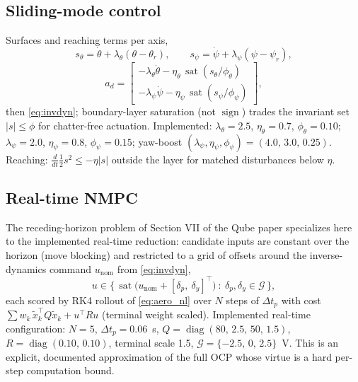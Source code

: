 \documentclass[conference]{IEEEtran}
\newcommand{\sat}{\operatorname{sat}}
\newcommand{\sign}{\operatorname{sign}}
\newcommand{\diag}{\operatorname{diag}}
\begin{document}
\subsection{Sliding-mode control}
Surfaces and reaching terms per axis,
\begin{equation}
s_\theta = \dot\theta + \lambda_\theta(\theta - \theta_r),\qquad
s_\psi = \dot\psi + \lambda_\psi(\psi - \psi_r),
\end{equation}
\begin{equation}
a_d = \begin{bmatrix}
-\lambda_\theta\dot\theta - \eta_\theta\,\sat(s_\theta/\phi_\theta)\\
-\lambda_\psi\dot\psi - \eta_\psi\,\sat(s_\psi/\phi_\psi)
\end{bmatrix},
\end{equation}
then \eqref{eq:invdyn}; boundary-layer saturation (not $\sign$) trades the invariant set $|s|\le\phi$ for chatter-free actuation. Implemented: $\lambda_\theta{=}2.5$, $\eta_\theta{=}0.7$, $\phi_\theta{=}0.10$; $\lambda_\psi{=}2.0$, $\eta_\psi{=}0.8$, $\phi_\psi{=}0.15$; yaw-boost $(\lambda_\psi,\eta_\psi,\phi_\psi) = (4.0,\,3.0,\,0.25)$. Reaching: $\tfrac{d}{dt}\tfrac12 s^2 \le -\eta|s|$ outside the layer for matched disturbances below $\eta$.

\subsection{Real-time NMPC}
The receding-horizon problem of Section VII of the Qube paper specializes here to the implemented real-time reduction: candidate inputs are constant over the horizon (move blocking) and restricted to a grid of offsets around the inverse-dynamics command $u_{\mathrm{nom}}$ from \eqref{eq:invdyn},
\begin{equation}
u \in \bigl\{\,\sat\bigl(u_{\mathrm{nom}} + [\delta_p,\ \delta_y]^{\!\top}\bigr)\ :\ \delta_p,\delta_y \in \mathcal G\,\bigr\},
\end{equation}
each scored by RK4 rollout of \eqref{eq:aero_nl} over $N$ steps of $\Delta t_p$ with cost $\sum w_k\,\tilde x_k^{\!\top}Q\tilde x_k + u^{\!\top}Ru$ (terminal weight scaled). Implemented real-time configuration: $N = 5$, $\Delta t_p = 0.06$~s, $Q = \diag(80,\,2.5,\,50,\,1.5)$, $R = \diag(0.10,\,0.10)$, terminal scale 1.5, $\mathcal G = \{-2.5,\,0,\,2.5\}$~V. This is an explicit, documented approximation of the full OCP whose virtue is a hard per-step computation bound.
\end{document}

